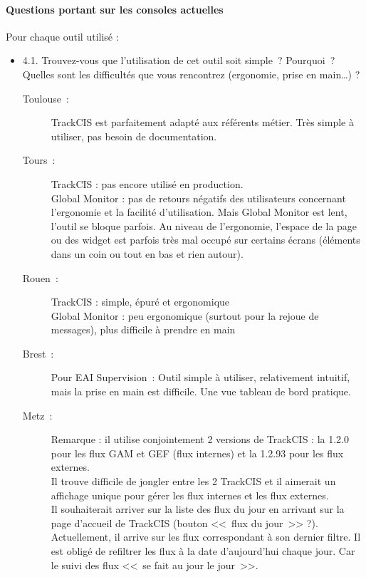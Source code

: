 	\paragraph{Questions portant sur les consoles actuelles}
	Pour chaque outil utilisé :
	\begin{itemize}
	  \item 4.1. Trouvez-vous que l’utilisation de cet outil soit simple~?
	  Pourquoi~? Quelles sont les difficultés que vous rencontrez (ergonomie,
	  prise en main…) ?
	  \begin{description}
	  	\item[Toulouse~:] TrackCIS est parfaitement adapté aux référents métier.
	  	Très simple à utiliser, pas besoin de documentation.
	  	\item[Tours~:] TrackCIS : pas encore utilisé en production.\\
		Global Monitor : pas de retours négatifs des utilisateurs concernant
		l’ergonomie et la facilité d’utilisation. Mais Global Monitor est lent,
		l’outil se bloque parfois. Au niveau de l’ergonomie, l’espace de la page ou
		des widget est parfois très mal occupé sur certains écrans (éléments dans un
		coin ou tout en bas et rien autour).
	  	\item[Rouen~:] TrackCIS : simple, épuré et ergonomique\\
		Global Monitor : peu ergonomique (surtout pour la rejoue de messages), plus
		difficile à prendre en main
	  	\item[Brest~:] Pour EAI Supervision~: Outil simple à utiliser, relativement
	  	intuitif, mais la prise en main est difficile. Une vue tableau de bord pratique.
	  	\item[Metz~:] Remarque : il utilise conjointement 2 versions de TrackCIS :
	  	la 1.2.0 pour les flux GAM et GEF (flux internes) et la 1.2.93 pour les
	  	flux externes.\\
	  	Il trouve difficile de jongler entre les 2 TrackCIS et il aimerait un
	  	affichage unique pour gérer les flux internes et les flux externes.\\
		Il souhaiterait arriver sur la liste des flux du jour en arrivant sur la page
		d’accueil de TrackCIS (bouton <<~flux du jour~>> ?). Actuellement, il arrive
		sur les flux correspondant à son dernier filtre. Il est obligé de refiltrer les
		flux à la date d’aujourd’hui chaque jour. Car le suivi des flux <<~se fait au
		jour le jour~>>.
	  \end{description}
	  

\end{itemize}
